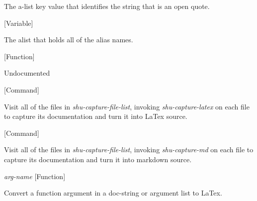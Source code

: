 \begin{doc-string}
The a-list key value that identifies the string that is an open quote.
\end{doc-string}

\vspace{1em}
\noindent
{}
\usebox{\funcname}
 \hfill [Variable]

\begin{doc-string}
The alist that holds all of the alias names.
\end{doc-string}

\vspace{1em}
\noindent
{}
\usebox{\funcname}
 \hfill [Function]

\begin{doc-string}
Undocumented
\end{doc-string}

\vspace{1em}
\noindent
{}
\usebox{\funcname}
 \hfill [Command]

\begin{doc-string}
Visit all of the files in \emph{shu-capture-file-list}, invoking \emph{shu-capture-latex} on
each file to capture its documentation and turn it into LaTex source.
\end{doc-string}

\vspace{1em}
\noindent
{}
\usebox{\funcname}
 \hfill [Command]

\begin{doc-string}
Visit all of the files in \emph{shu-capture-file-list}, invoking \emph{shu-capture-md} on each
file to capture its documentation and turn it into markdown source.
\end{doc-string}

\vspace{1em}
\noindent
{}
\usebox{\funcname}\emph{arg-name}
 \hfill [Function]

\begin{doc-string}
Convert a function argument in a doc-string or argument list to LaTex.
\end{doc-string}

